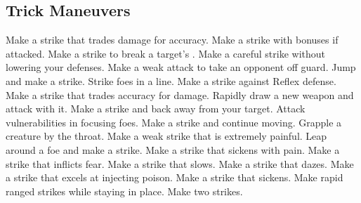 \small
\subsection{Trick Maneuvers}\label{Trick Maneuvers}
\begin{spelllist}
 Make a strike that trades damage for accuracy.
 Make a strike with bonuses if attacked.
 Make a strike to break a target's .
 Make a careful strike without lowering your defenses.
 Make a weak attack to take an opponent off guard.
 Jump and make a strike.
 Strike foes in a line.
 Make a strike against Reflex defense.
 Make a strike that trades accuracy for damage.
 Rapidly draw a new weapon and attack with it.
 Make a strike and back away from your target.
 Attack vulnerabilities in focusing foes.
 Make a strike and continue moving.
 Grapple a creature by the throat.
 Make a weak strike that is extremely painful.
 Leap around a foe and make a strike.
 Make a strike that sickens with pain.
 Make a strike that inflicts fear.
 Make a strike that slows.
 Make a strike that dazes.
 Make a strike that excels at injecting poison.
 Make a strike that sickens.
 Make rapid ranged strikes while staying in place.
 Make two strikes.
\end{spelllist}



\small

